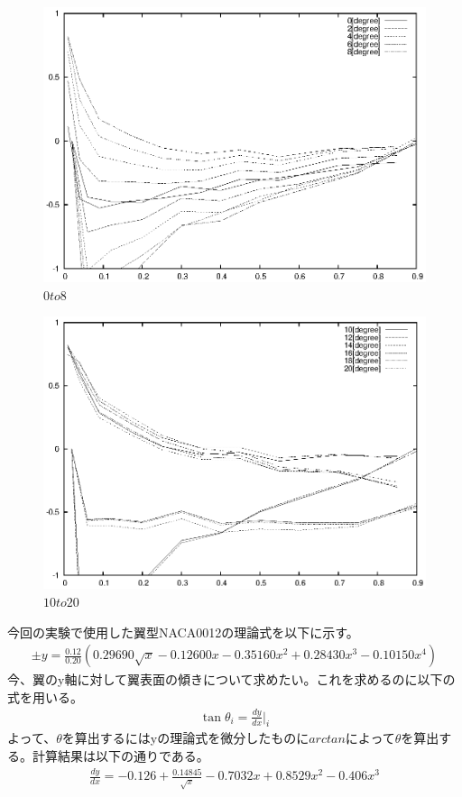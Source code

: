 \documentclass[a4j,twoside,openright,11pt]{jarticle}
\begin{document}
\begin{figure}[htbp]
\begin{center}
\includegraphics[width=12cm]{./2-CP/0to8.eps}
\end{center}
\caption{$0to8$}
\end{figure}

\begin{figure}[htbp]
\begin{center}
\includegraphics[width=12cm]{./2-CP/10-20.eps}
\end{center}
\caption{$10to20$}
\end{figure}

今回の実験で使用した翼型NACA0012の理論式を以下に示す。
\begin{eqnarray}
\pm y = \frac{0.12}{0.20}\left(0.29690\sqrt{x} -0.12600x -0.35160x^2 +0.28430x^3 -0.10150x^4 \right)
\end{eqnarray}
今、翼のy軸に対して翼表面の傾きについて求めたい。これを求めるのに以下の式を用いる。
\begin{eqnarray}
\tan \theta_i= \frac{dy}{dx}|_i
\end{eqnarray}
よって、$\theta$を算出するにはyの理論式を微分したものに$arctan$によって$\theta$を算出する。計算結果は以下の通りである。
\begin{eqnarray}
\frac{dy}{dx} = -0.126+\frac{0.14845}{\sqrt x}-0.7032x+0.8529x^2-0.406x^3
\end{eqnarray}
\end{document}
